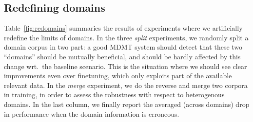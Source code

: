 \documentclass[11pt]{article}
\newcommand{\fyTodo}[1]{\Todo[FY:]{\textcolor{orange}{#1}}}
\begin{document}
\subsection{Redefining domains \label{ssec:redomains}}
Table~\ref{fig:redomains} summaries the results of \fyTodo{XX} experiments where we artificially redefine the limits of domains. In the three \textsl{split} experiments, we randomly split a domain corpus in two part: a good MDMT system should detect that these two ``domains'' should be mutually beneficial, and should be hardly affected by this change wrt.\ the baseline scenario. This is the situation where we should see clear improvements even over finetuning, which only exploits part of the available relevant data. In the \textsl{merge} experiment, we do the reverse and merge two corpora in training, in order to assess the robustness with respect to heterogenous domains. \fyTodo{Fix this}In the last column, we finally report the averaged (across domains) drop in performance when the domain information is erroneous.
\end{document}
